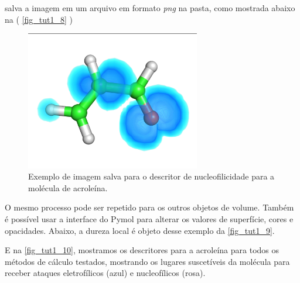\documentclass[a4paper,11pt]{refart}
\begin{document}
salva a imagem em um arquivo em formato \textit{png} na pasta, como mostrada abaixo na ( \autoref{fig_tut1_8} )


\hspace*{-\leftmarginwidth}
\begin{minipage}{\fullwidth}
\begin{figure}[H]
\begin{center}
\includegraphics[width=3in]{images/img9}
\caption{Exemplo de imagem salva para o descritor de nucleofilicidade para a molécula de acroleína.}
\label{fig_tut1_8}
\end{center}
\end{figure}
\end{minipage}

O mesmo processo pode ser repetido para os outros objetos de volume. Também é possível usar a interface do Pymol para alterar os valores de superfície, cores e opacidades. Abaixo, a dureza local é objeto desse exemplo da \autoref{fig_tut1_9}.

E na \autoref{fig_tut1_10}, mostramos os descritores para a acroleína para todos os métodos de cálculo testados, mostrando os lugares suscetíveis da molécula para receber ataques eletrofílicos (azul) e nucleofílicos (rosa).
\end{document}
